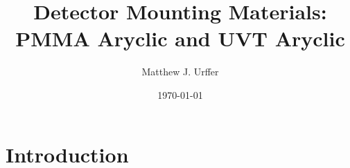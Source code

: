 \documentclass[draftcls,onecolumn]{IEEEtran}
\begin{document}
\title{Detector Mounting Materials: PMMA Aryclic and UVT Aryclic}
\author{Matthew J. Urffer}
\date{\today}
\maketitle

\listoftodos
\tableofcontents
\listoffigures
\listoftables
\lstlistoflistings
\section{Introduction}
\end{document}
